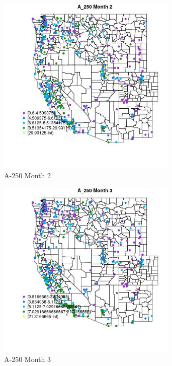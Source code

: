 \clearpage 

\begin{figure} 
\centering  
\includegraphics[width=0.77\textwidth]{Code_Outputs/ML_input_report_ML_input_PM25_Step5_part_d_de_duplicated_aves_ML_input_MapObsMo2A_250.jpg} 
\caption{\label{fig:ML_input_report_ML_input_PM25_Step5_part_d_de_duplicated_aves_ML_inputMapObsMo2A_250}A-250 Month 2} 
\end{figure} 
 

\begin{figure} 
\centering  
\includegraphics[width=0.77\textwidth]{Code_Outputs/ML_input_report_ML_input_PM25_Step5_part_d_de_duplicated_aves_ML_input_MapObsMo3A_250.jpg} 
\caption{\label{fig:ML_input_report_ML_input_PM25_Step5_part_d_de_duplicated_aves_ML_inputMapObsMo3A_250}A-250 Month 3} 
\end{figure} 
 


